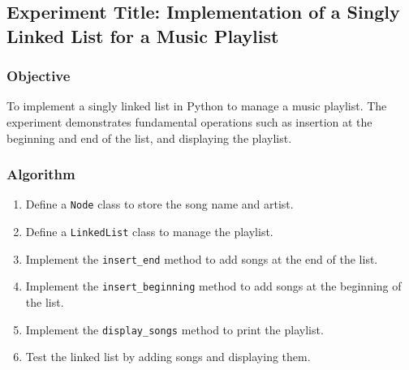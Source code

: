 \documentclass[a4paper,12pt]{article}
\begin{document}
\subsection*{Experiment Title: Implementation of a Singly Linked List for a Music Playlist}

\subsubsection*{Objective}
To implement a singly linked list in Python to manage a music playlist. The experiment demonstrates fundamental operations such as insertion at the beginning and end of the list, and displaying the playlist.

\subsubsection*{Algorithm}
\begin{enumerate}
    \item Define a \texttt{Node} class to store the song name and artist.
    \item Define a \texttt{LinkedList} class to manage the playlist.
    \item Implement the \texttt{insert\_end} method to add songs at the end of the list.
    \item Implement the \texttt{insert\_beginning} method to add songs at the beginning of the list.
    \item Implement the \texttt{display\_songs} method to print the playlist.
    \item Test the linked list by adding songs and displaying them.
\end{enumerate}
\end{document}
